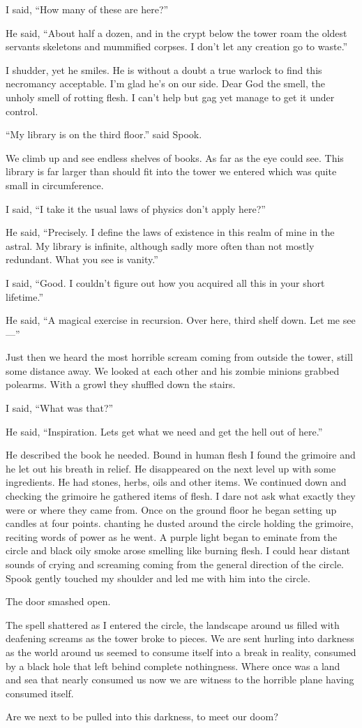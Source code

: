 I said, ``How many of these are here?''

He said, ``About half a dozen, and in the crypt below the tower roam the oldest servants skeletons and mummified corpses. I don't let any creation go to waste.''

I shudder, yet he smiles. He is without a doubt a true warlock to find this necromancy acceptable. I'm glad he's on our side. Dear God the smell, the unholy smell of rotting flesh. I can't help but gag yet manage to get it under control.

``My library is on the third floor.'' said Spook.

We climb up and see endless shelves of books. As far as the eye could see. This library is far larger than should fit into the tower we entered which was quite small in circumference.

I said, ``I take it the usual laws of physics don't apply here?''

He said, ``Precisely. I define the laws of existence in this realm of mine in the astral. My library is infinite, although sadly more often than not mostly redundant. What you see is vanity.''

I said, ``Good. I couldn't figure out how you acquired all this in your short lifetime.''

He said, ``A magical exercise in recursion. Over here, third shelf down. Let me see---''

Just then we heard the most horrible scream coming from outside the tower, still some distance away. We looked at each other and his zombie minions grabbed polearms. With a growl they shuffled down the stairs.

I said, ``What was that?''

He said, ``Inspiration. Lets get what we need and get the hell out of here.''

He described the book he needed. Bound in human flesh I found the grimoire and he let out his breath in relief. He disappeared on the next level up with some ingredients. He had stones, herbs, oils and other items. We continued down and checking the grimoire he gathered items of flesh. I dare not ask what exactly they were or where they came from. Once on the ground floor he began setting up candles at four points. chanting he dusted around the circle holding the grimoire, reciting words of power as he went. A purple light began to eminate from the circle and black oily smoke arose smelling like burning flesh. I could hear distant sounds of crying and screaming coming from the general direction of the circle. Spook gently touched my shoulder and led me with him into the circle.

The door smashed open.

The spell shattered as I entered the circle, the landscape around us filled with deafening screams as the tower broke to pieces. We are sent hurling into darkness as the world around us seemed to consume itself into a break in reality, consumed by a black hole that left behind complete nothingness. Where once was a land and sea that nearly consumed us now we are witness to the horrible plane having consumed itself.

Are we next to be pulled into this darkness, to meet our doom?

